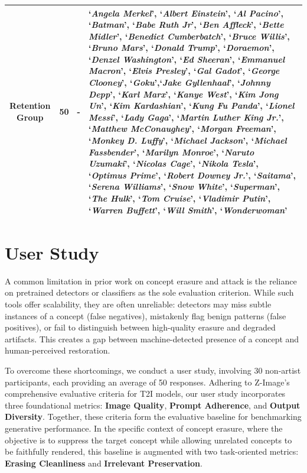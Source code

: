 \begin{table}[t]
\begin{tabular}{cccm{}}
Retention Group & 50 & - & ‘\textit{Angela Merkel}’, ‘\textit{Albert Einstein}’, ‘\textit{Al Pacino}’, ‘\textit{Batman}’, ‘\textit{Babe Ruth Jr}’, ‘\textit{Ben Affleck}’, ‘\textit{Bette Midler}’, ‘\textit{Benedict Cumberbatch}’, ‘\textit{Bruce Willis}’, ‘\textit{Bruno Mars}’, ‘\textit{Donald Trump}’, ‘\textit{Doraemon}’, ‘\textit{Denzel Washington}’, ‘\textit{Ed Sheeran}’, ‘\textit{Emmanuel Macron}’, ‘\textit{Elvis Presley}’, ‘\textit{Gal Gadot}’, ‘\textit{George Clooney}’, ‘\textit{Goku}’,‘\textit{Jake Gyllenhaal}’, ‘\textit{Johnny Depp}’, ‘\textit{Karl Marx}’, ‘\textit{Kanye West}’, ‘\textit{Kim Jong Un}’, ‘\textit{Kim Kardashian}’, ‘\textit{Kung Fu Panda}’, ‘\textit{Lionel Messi}’, ‘\textit{Lady Gaga}’, ‘\textit{Martin Luther King Jr.}’, ‘\textit{Matthew McConaughey}’, ‘\textit{Morgan Freeman}’, ‘\textit{Monkey D. Luffy}’, ‘\textit{Michael Jackson}’, ‘\textit{Michael Fassbender}’, ‘\textit{Marilyn Monroe}’, ‘\textit{Naruto Uzumaki}’, ‘\textit{Nicolas Cage}’, ‘\textit{Nikola Tesla}’, ‘\textit{Optimus Prime}’, ‘\textit{Robert Downey Jr.}’, ‘\textit{Saitama}’, ‘\textit{Serena Williams}’, ‘\textit{Snow White}’, ‘\textit{Superman}’, ‘\textit{The Hulk}’, ‘\textit{Tom Cruise}’, ‘\textit{Vladimir Putin}’, ‘\textit{Warren Buffett}’, ‘\textit{Will Smith}’, ‘\textit{Wonderwoman}’\\ \hline
\end{tabular}
\end{table}


\section{User Study}
\label{appendix: User study}

A common limitation in prior work on concept erasure and attack is the reliance on pretrained detectors or classifiers as the sole evaluation criterion. While such tools offer scalability, they are often unreliable: detectors may miss subtle instances of a concept (false negatives), mistakenly flag benign patterns (false positives), or fail to distinguish between high-quality erasure and degraded artifacts. This creates a gap between machine-detected presence of a concept and human-perceived restoration. 

To overcome these shortcomings, we conduct a user study, involving 30 non-artist participants, each providing an average of 50 responses. Adhering to Z-Image's comprehensive evaluative criteria for T2I models, our user study incorporates three foundational metrics: \textbf{Image Quality}, \textbf{Prompt Adherence}, and \textbf{Output Diversity}. Together, these criteria form the evaluative baseline for benchmarking generative performance. In the specific context of concept erasure, where the objective is to suppress the target concept while allowing unrelated concepts to be faithfully rendered, this baseline is augmented with two task-oriented metrics: \textbf{Erasing Cleanliness} and \textbf{Irrelevant Preservation}.

